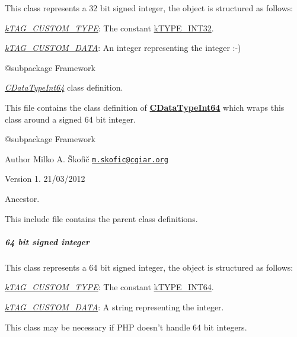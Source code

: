 This class represents a 32 bit signed integer, the object is structured as follows\-:


\begin{DoxyItemize}
\item {\itshape \hyperlink{}{k\-T\-A\-G\-\_\-\-C\-U\-S\-T\-O\-M\-\_\-\-T\-Y\-P\-E}}\-: The constant \hyperlink{}{k\-T\-Y\-P\-E\-\_\-\-I\-N\-T32}. 
\item {\itshape \hyperlink{}{k\-T\-A\-G\-\_\-\-C\-U\-S\-T\-O\-M\-\_\-\-D\-A\-T\-A}}\-: An integer representing the integer \-:-\/) 
\end{DoxyItemize}

\begin{DoxyVerb} @subpackage        Framework\end{DoxyVerb}


{\itshape \hyperlink{class_c_data_type_int64}{C\-Data\-Type\-Int64}} class definition.

This file contains the class definition of {\bfseries \hyperlink{class_c_data_type_int64}{C\-Data\-Type\-Int64}} which wraps this class around a signed 64 bit integer.

\begin{DoxyVerb} @subpackage        Framework
\end{DoxyVerb}


\begin{DoxyAuthor}{Author}
Milko A. Škofič \href{mailto:m.skofic@cgiar.org}{\tt m.\-skofic@cgiar.\-org} 
\end{DoxyAuthor}
\begin{DoxyVersion}{Version}
1. 21/03/2012
\end{DoxyVersion}
Ancestor.

This include file contains the parent class definitions. \subparagraph*{64 bit signed integer}

This class represents a 64 bit signed integer, the object is structured as follows\-:


\begin{DoxyItemize}
\item {\itshape \hyperlink{}{k\-T\-A\-G\-\_\-\-C\-U\-S\-T\-O\-M\-\_\-\-T\-Y\-P\-E}}\-: The constant \hyperlink{}{k\-T\-Y\-P\-E\-\_\-\-I\-N\-T64}. 
\item {\itshape \hyperlink{}{k\-T\-A\-G\-\_\-\-C\-U\-S\-T\-O\-M\-\_\-\-D\-A\-T\-A}}\-: A string representing the integer. 
\end{DoxyItemize}

This class may be necessary if P\-H\-P doesn't handle 64 bit integers.

